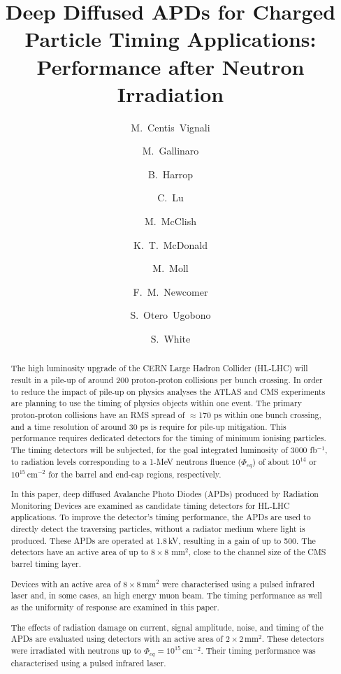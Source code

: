 \documentclass{article}
\title{Deep Diffused APDs for Charged Particle Timing Applications: Performance after Neutron Irradiation}
\author[1]{M.~Centis~Vignali}
\author[1,2]{M.~Gallinaro}
\author[3]{B.~Harrop}
\author[3]{C.~Lu}
\author[4]{M.~McClish}
\author[3]{K.~T.~McDonald}
\author[1]{M.~Moll}
\author[5]{F.~M.~Newcomer}
\author[1,6]{S.~Otero~Ugobono}
\author[1,7]{S.~White}
\affil[1]{CERN, Geneva, Switzerland}
\affil[2]{LIP, Lisbon, Portugal}
\affil[3]{Princeton University, Princeton, USA}
\affil[4]{Radiation Monitoring Devices, Watertown, USA}
\affil[5]{University of Pennsylvania, Philadelphia, USA}
\affil[6]{Universidade de Santiago de Compostela, Santiago de Compostela, Spain}
\affil[7]{University of Virginia, Charlottesville, USA}
\begin{document}
\maketitle

\begin{abstract}
The high luminosity upgrade of the CERN Large Hadron Collider (HL-LHC) will result in a pile-up of around 200 proton-proton collisions per bunch crossing.
In order to reduce the impact of pile-up on physics analyses the ATLAS and CMS experiments are planning to use the timing of physics objects within one event.
The primary proton-proton collisions have an RMS spread of $\approx$170 ps within one bunch crossing, and a time resolution of around 30 ps is require for pile-up mitigation.
This performance requires dedicated detectors for the timing of minimum ionising particles.
The timing detectors will be subjected, for the goal integrated luminosity of 3000 fb$^{-1}$, to radiation levels corresponding to a 1-MeV neutrons fluence ($\Phi_{eq}$) of about $10^{14}$ or $10^{15}$\,cm$^{-2}$ for the barrel and end-cap regions, respectively.

  
In this paper, deep diffused Avalanche Photo Diodes (APDs) produced by Radiation Monitoring Devices are examined as candidate timing detectors for HL-LHC applications.
To improve the detector's timing performance, the APDs are used to directly detect the traversing particles, without a radiator medium where light is produced.
These APDs are operated at 1.8\,kV, resulting in a gain of up to 500.
The detectors have an active area of up to $8 \times 8$ mm$^2$, close to the channel size of the CMS barrel timing layer.

Devices with an active area of $8 \times 8$\,mm$^2$ were characterised using a pulsed infrared laser and, in some cases, an high energy muon beam.
The timing performance as well as the uniformity of response are examined in this paper.

The effects of radiation damage on current, signal amplitude, noise, and timing of the APDs are evaluated using detectors with an active area of $2 \times 2$\,mm$^2$.
These detectors were irradiated with neutrons up to $\Phi_{eq} = 10^{15}$\,cm$^{-2}$.
Their timing performance was characterised using a pulsed infrared laser.



\end{abstract}
\end{document}
